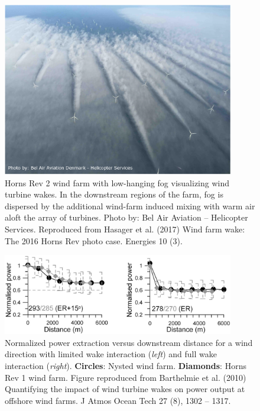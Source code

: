 \begin{figure}[t]
	\centering
	\includegraphics[width=0.9\textwidth]{chapters/introduction/HR2.eps}
	\caption{Horns Rev 2 wind farm with low-hanging fog visualizing wind turbine wakes. In the downstream regions of the farm, fog is dispersed by the additional wind-farm induced mixing with warm air aloft the array of turbines. Photo by: Bel Air Aviation -- Helicopter Services. Reproduced from Hasager et al. (2017) Wind farm wake: The 2016 Horns Rev photo case. Energies 10 (3). \label{fig:horns_rev}}
\end{figure}


\begin{figure}[t]
	\centering
	\includegraphics[width=0.9\textwidth]{chapters/introduction/power_barthelmie.eps}
	\caption{Normalized power extraction versus downstream distance for a wind direction with limited wake interaction (\emph{left}) and full wake interaction (\emph{right}). \textbf{Circles}: Nysted wind farm. {\color{gray} \textbf{Diamonds}}: Horns Rev 1 wind farm. Figure reproduced from Barthelmie et al. (2010) Quantifying the impact of wind turbine wakes on power output at offshore wind farms. J Atmos Ocean Tech 27 (8), 1302 -- 1317. \label{fig:power_deficiency}}
\end{figure}

